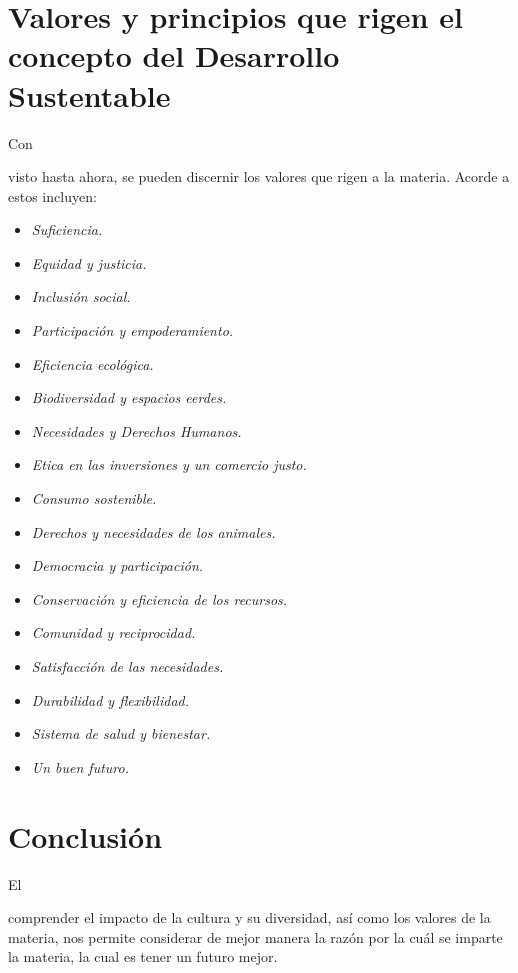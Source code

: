 \documentclass[stu, 12pt, letterpaper, donotrepeattitle, floatsintext, natbib]{apa7}
\begin{document}
\section{Valores y principios que rigen el concepto del Desarrollo Sustentable}
Con \begin{justifying}
    visto hasta ahora, se pueden discernir los valores que rigen a la materia. Acorde a %
    estos incluyen:
    \begin{itemize}
        \item \emph{Suficiencia.}
        \item \emph{Equidad y justicia.}
        \item \emph{Inclusión social.}
        \item \emph{Participación y empoderamiento.}
        \item \emph{Eficiencia ecológica.}
        \item \emph{Biodiversidad y espacios eerdes.}
        \item \emph{Necesidades y Derechos Humanos.}
        \item \emph{Etica en las inversiones y un comercio justo.}
        \item \emph{Consumo sostenible.}
        \item \emph{Derechos y necesidades de los animales.}
        \item \emph{Democracia y participación.}
        \item \emph{Conservación y eficiencia de los recursos.}
        \item \emph{Comunidad y reciprocidad.}
        \item \emph{Satisfacción de las necesidades.}
        \item \emph{Durabilidad y flexibilidad.}
        \item \emph{Sistema de salud y bienestar.}
        \item \emph{Un buen futuro.}
    \end{itemize}\par
\end{justifying}
\section*{Conclusión}
El \begin{justifying}
    comprender el impacto de la cultura y su diversidad, así como los valores de la materia, nos permite considerar de mejor manera la razón por la cuál
se imparte la materia, la cual es tener un futuro mejor.\par
\end{justifying}

\newpage
\setcounter{secnumdepth}{0} %
\renewcommand\refname{\textbf{Referencias}}
\end{document}
